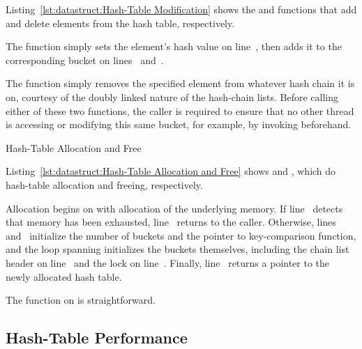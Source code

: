 Listing~\ref{lst:datastruct:Hash-Table Modification}
shows the  and  functions
that add and delete elements from the hash table, respectively.

\begin{fcvref}
The  function simply sets the element's hash
value on line~, then adds it to the corresponding bucket on
lines~ and~.
\end{fcvref}
The  function simply removes the specified element
from whatever hash chain it is on, courtesy of the doubly linked
nature of the hash-chain lists.
Before calling either of these two functions, the caller is required to
ensure that no other thread is accessing
or modifying this same bucket, for example, by invoking
 beforehand.

\begin{listing}[tb]

\caption{Hash-Table Allocation and Free}
\label{lst:datastruct:Hash-Table Allocation and Free}
\end{listing}

Listing~\ref{lst:datastruct:Hash-Table Allocation and Free}
shows  and ,
which do hash-table allocation and freeing, respectively.
\begin{fcvref}
Allocation begins on
 with allocation of the underlying memory.
If line~ detects that memory has been exhausted,
line~ returns
 to the caller.
Otherwise, lines~ and~ initialize
the number of buckets and the pointer to key-comparison function,
and the loop
spanning  initializes the buckets themselves,
including the chain list header on
line~ and the lock on line~.
Finally, line~ returns a pointer to the newly allocated hash table.
\end{fcvref}
\begin{fcvref}
The  function on
 is straightforward.
\end{fcvref}

\subsection{Hash-Table Performance}
\label{sec:datastruct:Hash-Table Performance}

